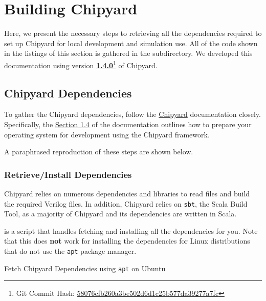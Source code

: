 \section{Building Chipyard}\label{sec:Building_Chipyard}
Here, we present the necessary steps to retrieving all the dependencies required to set up Chipyard for local development and simulation use.
All of the code shown in the listings of this section is gathered in the  subdirectory.
We developed this documentation using version \href{https://github.com/ucb-bar/chipyard/releases/tag/1.4.0}{\textbf{1.4.0}}\footnote{Git Commit Hash: \href{https://github.com/ucb-bar/chipyard/commit/58076cfb260a3be502d6d1c25b577da39277a7fc}{58076cfb260a3be502d6d1c25b577da39277a7fc}} of Chipyard.

\subsection{Chipyard Dependencies}\label{sec:Chipyard_Dependencies}
To gather the Chipyard dependencies, follow the \href{https://chipyard.readthedocs.io/en/latest/}{Chipyard} documentation closely.
Specifically, the \href{https://chipyard.readthedocs.io/en/latest/Chipyard-Basics/Initial-Repo-Setup.html}{Section 1.4} of the documentation outlines how to prepare your operating system for development using the Chipyard framework.

A paraphrased reproduction of these steps are shown below.

\subsubsection{Retrieve/Install Dependencies}\label{sec:Retrive_Install_Dependencies}
Chipyard relies on numerous dependencies and libraries to read files and build the required Verilog files.
In addition, Chipyard relies on \texttt{sbt}, the Scala Build Tool, as a majority of Chipyard and its dependencies are written in Scala.

 is a script that handles fetching and installing all the dependencies for you.
Note that this does \textbf{not} work for installing the dependencies for Linux distributions that do not use the \texttt{apt} package manager.

\begin{listing}[h!tbp]
\caption{Fetch Chipyard Dependencies using \texttt{apt} on Ubuntu}
\label{lst:Ubuntu_Chipyard_Deps_Setup}
\end{listing}

